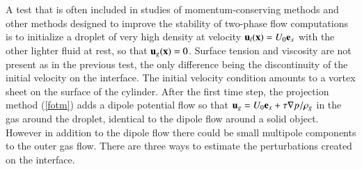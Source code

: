 A test that is often included in studies of momentum-conserving methods
\cite{bussmann2002modeling,desjardins10,raessi12,le13,Vaudor:2017ip}
and other methods designed to improve the stability of two-phase flow
computations \cite{Fuster2013energy} is to initialize a droplet of very
high density at velocity ${\bf u}_l({\bf x})=U_0 {\bf e}_x$ with the other lighter fluid at
rest, so that ${\bf u}_g({\bf x})=0$. Surface tension and viscosity are not present 
as in the previous test, the only difference being the
discontinuity of the initial velocity on the interface. 
The initial velocity condition amounts to a vortex sheet on the surface 
of the cylinder. After the first time step, the projection method (\ref{fotm}) 
adds a dipole potential flow so that ${\bf u}_g = U_0 {\bf e}_x + \tau \nabla p / \rho_g$ 
in the gas around the droplet, identical to the dipole flow around a solid object.
However in addition to the dipole flow there could be small multipole components 
to the outer gas flow. 
There are three ways to estimate the perturbations created on the interface.
